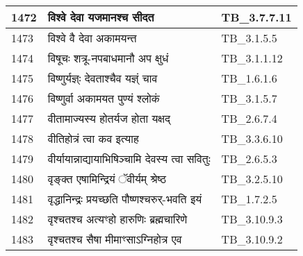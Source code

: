\documentclass[17pt]{extarticle}
\begin{document}
\begin{longtable}{||p{0.4in}||p{4.9in}||p{0.9in}||}
    \hline
        
    1472 & विश्वे देवा यजमानश्च सीदत & TB\_3.7.7.11       \\
    
    \hline
        
    1473 & विश्वे वै देवा अकामयन्त & TB\_3.1.5.5       \\
    
    \hline
        
    1474 & विषूचः शत्रू{-}नपबाधमानौ अप क्षुधं & TB\_3.1.1.12       \\
    
    \hline
        
    1475 & विष्णुर्यज्ञ्ः देवताश्चैव यज्ञ्ं चाव & TB\_1.6.1.6       \\
    
    \hline
        
    1476 & विष्णुर्वा अकामयत पुण्यं श्लोकं & TB\_3.1.5.7       \\
    
    \hline
        
    1477 & वीतामाज्यस्य होतर्यज होता यक्षद् & TB\_2.6.7.4       \\
    
    \hline
        
    1478 & वीतिहोत्रं त्वा कव इत्याह & TB\_3.3.6.10       \\
    
    \hline
        
    1479 & वीर्यायान्नाद्यायाभिषिञ्चामि देवस्य त्वा सवितुः & TB\_2.6.5.3       \\
    
    \hline
        
    1480 & वृङ्क्त एषामिन्द्रियं ॅवीर्यम् श्रेष्ठ & TB\_3.2.5.10       \\
    
    \hline
        
    1481 & वृद्धानिन्द्रः प्रयच्छति पौष्णश्चरुर्{-}भवति इयं & TB\_1.7.2.5       \\
    
    \hline
        
    1482 & वृश्चतश्च अत्यꣳहो हारुणिः ब्रह्मचारिणे & TB\_3.10.9.3       \\
    
    \hline
        
    1483 & वृश्चतश्च सैषा मीमाꣳसाऽग्निहोत्र एव & TB\_3.10.9.2       \\
    
    \hline
        

\end{longtable}
\end{document}
